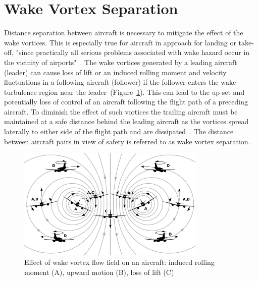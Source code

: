 \section{Wake Vortex Separation}
Distance separation between aircraft is necessary to mitigate the effect of the wake vortices.
This is especially true for aircraft in approach for landing or take-off, "since practically all serious problems associated with wake hazard occur in the vicinity of airports"~\cite[p.~5]{dup._donamdson_vortex_1975}. 
The wake vortices generated by a leading aircraft (leader) can cause loss of lift or an induced rolling moment and velocity fluctuations in a following aircraft (follower) if the follower enters the wake turbulence region near the leader~(Figure~\ref{fig:vortex_encounter}).
This can lead to the up-set and potentially loss of control of an aircraft following the flight path of a preceding aircraft.
To diminish the effect of such vortices the trailing aircraft must be maintained at a safe distance behind the leading aircraft as the vortices spread laterally to either side of the flight path and are dissipated~\cite{Breitsamter2011Feb}.
The distance between aircraft pairs in view of safety is referred to as wake vortex separation. 
\begin{figure}[h]
    \centering
    \includegraphics[width=0.8\textwidth]{graphics/reaction_in_wake.jpg}
    \caption[Wake vortex encounter]{Effect of wake vortex flow field on an aircraft: induced rolling moment (A), upward motion (B), loss of lift (C)~\cite[p.~33]{Hallock2018Apr}} \label{fig:vortex_encounter}
\end{figure}

